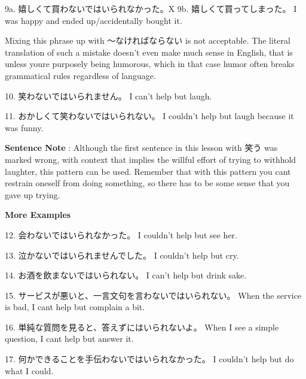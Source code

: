 \par{9a. 嬉しくて買わないではいられなかった。X \hfill\break
9b. 嬉しくて買ってしまった。 \hfill\break
I was happy and ended up\slash accidentally bought it. }

\par{ Mixing this phrase up with ～なければならない is not acceptable. The literal translation of such a mistake doesn't even make much sense in English, that is unless you\textquotesingle re purposely being humorous, which in that case humor often breaks grammatical rules regardless of language. }

\par{10. 笑わないではいられません。 \hfill\break
I can't help but laugh. }

\par{11. おかしくて笑わないではいられない。 \hfill\break
I couldn't help but laugh because it was funny. }

\par{\textbf{Sentence Note }: Although the first sentence in this lesson with 笑う was marked wrong, with context that implies the willful effort of trying to withhold laughter, this pattern can be used. Remember that with this pattern you can\textquotesingle t restrain oneself from doing something, so there has to be some sense that you gave up trying. }

\begin{center}
 \textbf{More Examples }
\end{center}

\par{12. 会わないではいられなかった。 \hfill\break
I couldn't help but see her. }

\par{13. 泣かないではいられませんでした。 \hfill\break
I couldn't help but cry. }

\par{14. お酒を飲まないではいられない。 \hfill\break
I can't help but drink sake. }

\par{15. サービスが悪いと、一言文句を言わないではいられない。 \hfill\break
When the service is bad, I can\textquotesingle t help but complain a bit.  }

\par{16. 単純な質問を見ると、答えずにはいられないよ。 \hfill\break
When I see a simple question, I can\textquotesingle t help but answer it. }

\par{17. 何かできることを手伝わないではいられなかった。 \hfill\break
I couldn't help but do what I could. }

